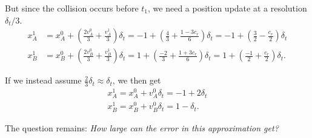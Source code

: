 \documentclass[a4paper,11pt, oneside]{article}
\begin{document}
\begin{enumerate}
But since the collision occurs before $t_1$, we need a position update at a resolution $\delta_t/3$.
\begin{align*}
    x_A^1 &= x_A^0 + \left(\frac{2v_A^0}{3} + \frac{v_A^1}{3}\right)\delta_t = -1 + \left(\frac{4}{3} + \frac{1-3c_r}{6}\right)\delta_t = -1 + \left(\frac{3}{2}-\frac{c_r}{2}\right)\delta_t\\
    x_B^1 &= x_B^0 + \left(\frac{2v_B^0}{3} + \frac{v_B^1}{3}\right)\delta_t = 1 + \left(\frac{-2}{3} + \frac{1+3c_r}{6}\right)\delta_t = 1 + \left(\frac{-1}{2}+\frac{c_r}{2}\right)\delta_t.
\end{align*}

If we instead assume $\frac{2}{3}\delta_t \approx \delta_t$, we then get
\begin{align*}
    x_A^1 = x_A^0 + v_A^0 \delta_t = -1 + 2\delta_t\\
    x_B^1 = x_B^0 + v_B^0 \delta_t = 1 -  \delta_t.
\end{align*}

The question remains: \emph{How large can the error in this approximation get?}

\end{enumerate}
\end{document}

